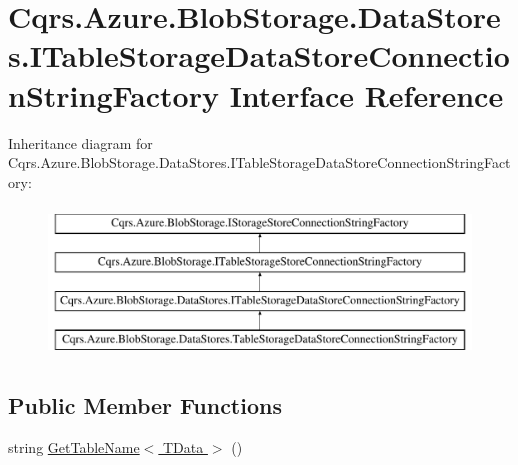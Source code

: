 \hypertarget{interfaceCqrs_1_1Azure_1_1BlobStorage_1_1DataStores_1_1ITableStorageDataStoreConnectionStringFactory}{}\section{Cqrs.\+Azure.\+Blob\+Storage.\+Data\+Stores.\+I\+Table\+Storage\+Data\+Store\+Connection\+String\+Factory Interface Reference}
\label{interfaceCqrs_1_1Azure_1_1BlobStorage_1_1DataStores_1_1ITableStorageDataStoreConnectionStringFactory}
Inheritance diagram for Cqrs.\+Azure.\+Blob\+Storage.\+Data\+Stores.\+I\+Table\+Storage\+Data\+Store\+Connection\+String\+Factory\+:\begin{figure}[H]
\begin{center}
\leavevmode
\includegraphics[height=4.000000cm]{interfaceCqrs_1_1Azure_1_1BlobStorage_1_1DataStores_1_1ITableStorageDataStoreConnectionStringFactory}
\end{center}
\end{figure}
\subsection*{Public Member Functions}
\begin{DoxyCompactItemize}
\item 
string \hyperlink{interfaceCqrs_1_1Azure_1_1BlobStorage_1_1DataStores_1_1ITableStorageDataStoreConnectionStringFactory_a40ff0417d18d0cf9d0f59d6dfddfaa15_a40ff0417d18d0cf9d0f59d6dfddfaa15}{Get\+Table\+Name$<$ T\+Data $>$} ()
\end{DoxyCompactItemize}


